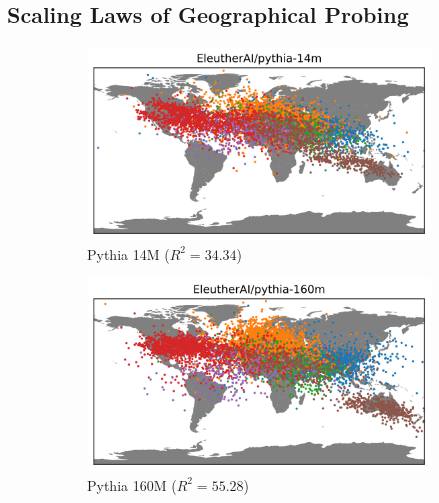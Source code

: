 \subsection{Scaling Laws of Geographical Probing}
\label{sec:scaling}
\begin{figure}[h]
    \centering
    \begin{subfigure}[b]{0.43\textwidth}
         \includegraphics[trim={0 0 0 0.7cm},clip,width=\linewidth]{sources/part_1/geographical/imgs/pythia-14m.png}
         \caption{Pythia 14M ($R^2 = 34.34$)}
         \label{fig:14m_map}
         \vspace{1em}
    \end{subfigure}
    \begin{subfigure}[b]{0.43\textwidth}
         \includegraphics[trim={0 0 0 0.7cm},clip,width=\linewidth]{sources/part_1/geographical/imgs/pythia-160m.png}
         \caption{Pythia 160M ($R^2 = 55.28$)}
         \label{fig:160m_map}
        \vspace{1em}
    \end{subfigure}
    \begin{subfigure}[b]{0.43\textwidth}

\end{subfigure}
\end{figure}
